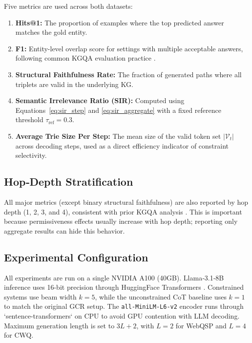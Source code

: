 Five metrics are used across both datasets:

\begin{enumerate}
  \item \textbf{Hits@1:} The proportion of examples where the top predicted answer matches the gold entity.

  \item \textbf{F1:} Entity-level overlap score for settings with multiple acceptable answers, following common KGQA evaluation practice \citep{lan2022survey}.

  \item \textbf{Structural Faithfulness Rate:} The fraction of generated paths where all triplets are valid in the underlying KG.

  \item \textbf{Semantic Irrelevance Ratio (SIR):} Computed using Equations~\eqref{eq:sir_step} and \eqref{eq:sir_aggregate} with a fixed reference threshold $\tau_{\text{ref}}=0.3$.

  \item \textbf{Average Trie Size Per Step:} The mean size of the valid token set $|\mathcal{V}_t|$ across decoding steps, used as a direct efficiency indicator of constraint selectivity.
\end{enumerate}

\subsection{Hop‑Depth Stratification}

All major metrics (except binary structural faithfulness) are also reported by hop depth (1, 2, 3, and 4), consistent with prior KGQA analysis \citep{lan2022survey}. This is important because permissiveness effects usually increase with hop depth; reporting only aggregate results can hide this behavior.

\subsection{Experimental Configuration}

All experiments are run on a single NVIDIA A100 (40GB). Llama‑3.1‑8B inference uses 16-bit precision through HuggingFace Transformers \citep{wolf2020transformers}. Constrained systems use beam width $k=5$, while the unconstrained CoT baseline uses $k=1$ to match the original GCR setup. The \texttt{all-MiniLM-L6-v2} encoder runs through `sentence-transformers` \citep{reimers2019sbert} on CPU to avoid GPU contention with LLM decoding. Maximum generation length is set to $3L+2$, with $L=2$ for WebQSP and $L=4$ for CWQ.

